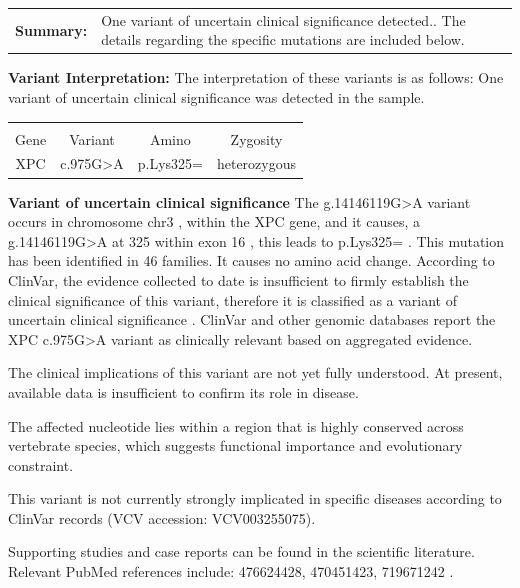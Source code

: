\documentclass[11pt]{extarticle}
\begin{document}
\begin{tabularx}{\textwidth}{S X}
{\bf \large Summary: } & One variant of uncertain clinical significance detected.. The details regarding the specific mutations are included below. 
\end{tabularx}

\newpage
\vspace{2em}
{\Huge \bf Variant Interpretation: } 
\newline
\newline The interpretation of these variants is as follows: One variant of uncertain clinical significance   was detected in the sample. 

 \vspace{2em}{\bf \large Variant 1 of 1 }
      \newline \vspace{2em} \begin{tabularx}{\textwidth}{C C C C} 
 &&&\\ Gene & Variant & Amino & Zygosity\\ XPC  &  c.975G>A & p.Lys325=  &  heterozygous 
\end{tabularx} \vspace{2em} {\bf Variant of uncertain clinical significance } \newline
The g.14146119G>A variant occurs in chromosome chr3 , within the XPC gene, and it causes, a g.14146119G>A at 325 within exon 16 , this leads to p.Lys325= . This mutation has been identified in 46 families. It 
causes no amino acid change.
According to ClinVar, the evidence collected to date is insufficient to firmly establish the clinical significance of this variant, therefore it is classified as a variant of uncertain clinical significance .
ClinVar and other genomic databases report the XPC c.975G>A variant as clinically relevant based on aggregated evidence. 

 The clinical implications of this variant are not yet fully 
        understood. At present, available data is insufficient 
        to confirm its role in disease. 

The affected nucleotide lies within a region 
  that is highly conserved across vertebrate species, which suggests functional importance and evolutionary constraint. 


      This variant is not currently strongly implicated in specific diseases according to ClinVar records  (VCV accession: VCV003255075). 

Supporting studies and case reports can be found 
  in the scientific literature. Relevant PubMed references include: 476624428, 470451423, 719671242 . \newpage
\end{document}
